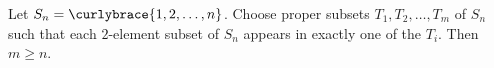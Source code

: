 Let $S_n=\curlybrace{1,2,\ldots,n}$. Choose proper subsets $T_1,T_2,\ldots,T_m$ of $S_n$ such that each $2$-element subset of $S_n$ appears in exactly one of the $T_i$. Then $m\geq n$.